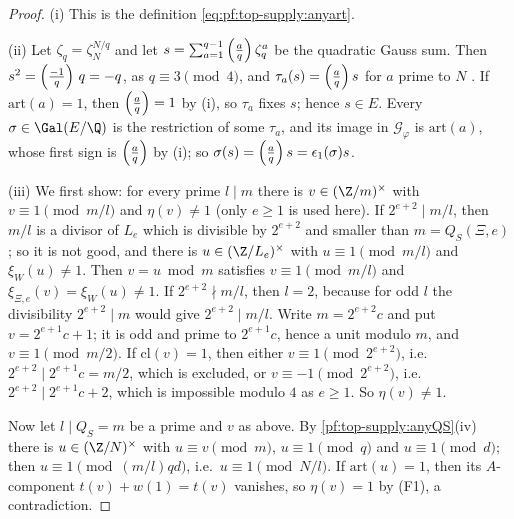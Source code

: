 \begin{proof}
(i) This is the definition \eqref{eq:pf:top-supply:anyart}.

(ii) Let $\zeta_q=\zeta_N^{N/q}$ and let $s=\sum_{a=1}^{q-1}\left(\frac{a}{q}\right)\zeta_q^a$ be the quadratic Gauss sum. Then
$s^2=\left(\frac{-1}{q}\right)\,q=-q$, as $q\equiv3\pmod4$, and $\tau_a(s)=\left(\frac{a}{q}\right) s$ for $a$ prime to $N$
\cite[Ch.~2]{Davenport2000}. If $\mathrm{art}(a)=1$, then $\left(\frac{a}{q}\right)=1$ by (i), so $\tau_a$ fixes $s$; hence $s\in E$.
Every $\sigma\in\Gal(E/\Q)$ is the restriction of some $\tau_a$, and its image in $\mathcal G_\varphi$ is $\mathrm{art}(a)$,
whose first sign is $\left(\frac{a}{q}\right)$ by (i); so $\sigma(s)=\left(\frac{a}{q}\right) s=\epsilon_1(\sigma)s$.

(iii) We first show: for every prime $l\mid m$ there is $v\in(\Z/m)^\times$ with $v\equiv1\pmod{m/l}$ and $\eta(v)\ne1$
(only $e\ge1$ is used here). If $2^{e+2}\mid m/l$, then $m/l$ is a divisor of $L_e$ which is divisible by $2^{e+2}$ and
smaller than $m=Q_S(\Xi,e)$; so it is not good, and there is $u\in(\Z/L_e)^\times$ with $u\equiv1\pmod{m/l}$ and
$\xi_W(u)\ne1$. Then $v=u\bmod m$ satisfies $v\equiv1\pmod{m/l}$ and $\xi_{\Xi,e}(v)=\xi_W(u)\ne1$. If $2^{e+2}\nmid m/l$,
then $l=2$, because for odd $l$ the divisibility $2^{e+2}\mid m$ would give $2^{e+2}\mid m/l$. Write $m=2^{e+2}c$ and put
$v=2^{e+1}c+1$; it is odd and prime to $2^{e+1}c$, hence a unit modulo $m$, and $v\equiv1\pmod{m/2}$. If
$\mathrm{cl}(v)=1$, then either $v\equiv1\pmod{2^{e+2}}$, i.e.\ $2^{e+2}\mid2^{e+1}c=m/2$, which is excluded, or
$v\equiv-1\pmod{2^{e+2}}$, i.e.\ $2^{e+2}\mid2^{e+1}c+2$, which is impossible modulo $4$ as $e\ge1$. So $\eta(v)\ne1$.

Now let $l\mid Q_S=m$ be a prime and $v$ as above. By \cref{pf:top-supply:anyQS}(iv) there is $u\in(\Z/N)^\times$ with
$u\equiv v\pmod m$, $u\equiv1\pmod q$ and $u\equiv1\pmod d$; then $u\equiv1\pmod{(m/l)qd}$, i.e.\ $u\equiv1\pmod{N/l}$. If
$\mathrm{art}(u)=1$, then its $A$-component $t(v)+w(1)=t(v)$ vanishes, so $\eta(v)=1$ by (F1), a contradiction.
\end{proof}

